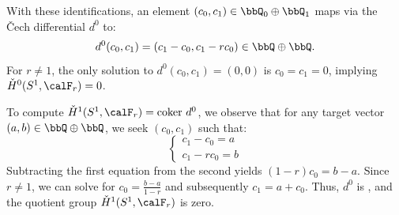 \begin{example}
    With these identifications, an element $(c_0, c_1) \in \bbQ_0 \oplus \bbQ_1$ maps via the Čech differential $d^0$ to:
    $$d^0(c_0, c_1) = (c_1 - c_0, c_1 - r c_0) \in \bbQ \oplus \bbQ.$$
    For $r \neq 1$, the only solution to $d^0(c_0, c_1) = (0, 0)$ is $c_0 = c_1 = 0$, implying $\check{H}^0(S^1, \calF_r) = 0$. 

    To compute $\check{H}^1(S^1, \calF_r) = \text{coker } d^0$, we observe that for any target vector $(a, b) \in \bbQ \oplus \bbQ$, we seek $(c_0, c_1)$ such that:
    $$ \begin{cases} c_1 - c_0 = a \\ c_1 - r c_0 = b \end{cases} $$
    Subtracting the first equation from the second yields $(1-r)c_0 = b - a$. Since $r \neq 1$, we can solve for $c_0 = \frac{b-a}{1-r}$ and subsequently $c_1 = a + c_0$. Thus, $d^0$ is , and the quotient group $\check{H}^1(S^1, \calF_r)$ is zero.
    
\end{example}


